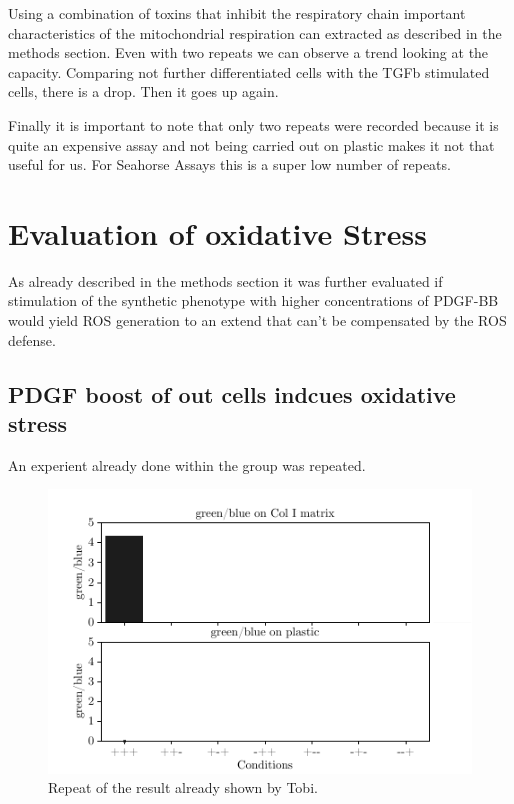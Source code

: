     Using a combination of toxins that inhibit the respiratory chain important characteristics of the mitochondrial respiration can extracted as described in the methods section. Even with two repeats we can observe a trend looking at the capacity. Comparing not further differentiated cells with the TGFb stimulated cells, there is a drop. Then it goes up again.

    Finally it is important to note that only two repeats were recorded because it is quite an expensive assay and not being carried out on plastic makes it not that useful for us. For Seahorse Assays this is a super low number of repeats.

\section{Evaluation of oxidative Stress}
\label{sec:oxStress}
As already described in the methods section it was further evaluated if stimulation of the synthetic phenotype with higher concentrations of PDGF-BB would yield ROS generation to an extend that can't be compensated by the ROS defense.

    \subsection{PDGF boost of out cells indcues oxidative stress}
    An experient already done within the group was repeated.

    \begin{figure}[h]
    \capstart
        \centering
    	\includegraphics{Abbildung/CellROX_initial_cond.pdf}

    	\begin{minipage}{\captionwidth}
    		\caption[repeat_Lisa]{ \newline Repeat of the result already shown by Tobi.}
    		\label{fig:qPCR}
    	\end{minipage}
    \end{figure}

